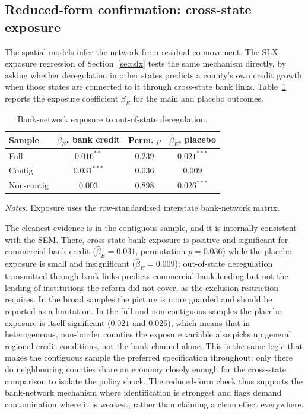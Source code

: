 \subsection{Reduced-form confirmation: cross-state exposure}
\label{sec:slx-results}

The spatial models infer the network from residual co-movement. The SLX exposure
regression of Section~\ref{sec:slx} tests the same mechanism directly, by asking
whether deregulation in other states predicts a county's own credit growth
when those states are connected to it through cross-state bank links.
Table~\ref{tab:slx} reports the exposure coefficient $\beta_E$ for the main and
placebo outcomes.

\begin{table}[htbp]
  \centering
  \caption{Bank-network exposure to out-of-state deregulation.}
  \label{tab:slx}
  \begin{tabular}{lccc}
    \toprule
    Sample & $\hat\beta_E$, bank credit & Perm. $p$ & $\hat\beta_E$, placebo \\
    \midrule
    Full & $0.016^{**}$ & $0.239$ & $0.021^{***}$ \\
    Contig & $0.031^{***}$ & $0.036$ & $0.009$ \\
    Non-contig & $0.003$ & $0.898$ & $0.026^{***}$ \\
    \bottomrule
  \end{tabular}
  \begin{tablenotes}\footnotesize
  \item \emph{Notes.} Exposure uses the row-standardised interstate bank-network matrix.
  \end{tablenotes}
\end{table}


The cleanest evidence is in the contiguous sample, and it is internally
consistent with the SEM. There, cross-state bank exposure is positive and
significant for commercial-bank credit ($\hat\beta_E = 0.031$, permutation
$p=0.036$) while the placebo exposure is small and insignificant
($\hat\beta_E = 0.009$): out-of-state deregulation transmitted through bank links
predicts commercial-bank lending but not the lending of institutions the reform
did not cover, as the exclusion restriction requires. In the broad samples the
picture is more guarded and should be reported as a limitation. In the full and
non-contiguous samples the placebo exposure is itself significant
($0.021$ and $0.026$), which means that in heterogeneous, non-border counties the
exposure variable also picks up general regional credit conditions, not the bank
channel alone. This is the same logic that makes the contiguous sample the
preferred specification throughout: only there do neighbouring counties share an
economy closely enough for the cross-state comparison to isolate the policy
shock. The reduced-form check thus supports the bank-network mechanism where
identification is strongest and flags demand contamination where it is weakest,
rather than claiming a clean effect everywhere.

